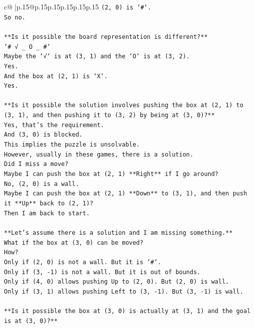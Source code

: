 \documentclass{article}
\begin{document}
{\begin{supertabular}{c@{$\;$}|p{.15\linewidth}@{}p{.15\linewidth}p{.15\linewidth}p{.15\linewidth}p{.15\linewidth}p{.15\linewidth}}
{{{\texttt{(2, 0) is `\#`.} \\
\texttt{So no.} \\
\\ 
\texttt{**Is it possible the board representation is different?**} \\
\texttt{`\# √ \_ O \_ \#`} \\
\texttt{Maybe the `√` is at (3, 1) and the `O` is at (3, 2).} \\
\texttt{Yes.} \\
\texttt{And the box at (2, 1) is `X`.} \\
\texttt{Yes.} \\
\\ 
\texttt{**Is it possible the solution involves pushing the box at (2, 1) to (3, 1), and then pushing it to (3, 2) by being at (3, 0)?**} \\
\texttt{Yes, that's the requirement.} \\
\texttt{And (3, 0) is blocked.} \\
\texttt{This implies the puzzle is unsolvable.} \\
\texttt{However, usually in these games, there is a solution.} \\
\texttt{Did I miss a move?} \\
\texttt{Maybe I can push the box at (2, 1) **Right** if I go around?} \\
\texttt{No, (2, 0) is a wall.} \\
\texttt{Maybe I can push the box at (2, 1) **Down** to (3, 1), and then push it **Up** back to (2, 1)?} \\
\texttt{Then I am back to start.} \\
\\ 
\texttt{**Let's assume there is a solution and I am missing something.**} \\
\texttt{What if the box at (3, 0) can be moved?} \\
\texttt{How?} \\
\texttt{Only if (2, 0) is not a wall. But it is `\#`.} \\
\texttt{Only if (3, {-}1) is not a wall. But it is out of bounds.} \\
\texttt{Only if (4, 0) allows pushing Up to (2, 0). But (2, 0) is wall.} \\
\texttt{Only if (3, 1) allows pushing Left to (3, {-}1). But (3, {-}1) is wall.} \\
\\ 
\texttt{**Is it possible the box at (3, 0) is actually at (3, 1) and the goal is at (3, 0)?**} \\
}}}
\end{supertabular}}
\end{document}
